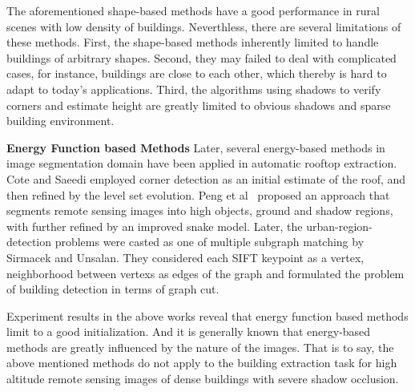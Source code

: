 The aforementioned shape-based methods have a good performance in rural scenes with low density of buildings.
Neverthless, there are several limitations of these methods.
First, the shape-based methods inherently limited to handle buildings of arbitrary shapes.
Second, they may failed to deal with complicated cases, for instance, buildings are close to each other, which thereby is hard to adapt to today's applications.
Third, the algorithms using shadows to verify corners and estimate height are greatly limited to obvious shadows and sparse building environment.


\textbf{Energy Function based Methods} Later, several energy-based methods in image segmentation domain have been applied in automatic rooftop extraction.
Cote and Saeedi\cite{IEEEexample:cote2013automatic} employed corner detection as an initial estimate of the roof, and then refined by the level set evolution.
Peng et al~\cite{IEEEexample:peng2005improved} proposed an approach that segments remote sensing images into high objects, ground and shadow regions, with further refined by an improved snake model.
Later, the urban-region-detection problems were casted as one of multiple subgraph matching by Sirmacek and Unsalan\cite{IEEEexample:sirmacek2009urban}.
They considered each SIFT keypoint as a vertex, neighborhood between vertexs as edges of the graph and formulated the problem of building detection in terms of graph cut.

Experiment results in the above works reveal that energy function based methods limit to a good initialization.
And it is generally known that energy-based methods are greatly influenced by the nature of the images.
That is to say, the above mentioned methods do not apply to the building extraction task for high altitude remote sensing images of dense buildings with severe shadow occlusion.


